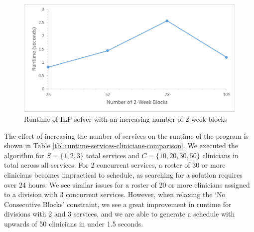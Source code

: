 \begin{figure}[h]
	\centering
	\includegraphics[scale=.5]{fig/runtime_blocks}
	\caption{Runtime of ILP solver with an increasing number of 2-week blocks}
	\label{fig:runtime-blocks}
\end{figure}

The effect of increasing the number of services %
on the runtime of the program is shown in Table \ref{tbl:runtime-services-clinicians-comparison}. We executed the algorithm for $S = \{1, 2, 3\}$ total services and $C = \{10, 20, 30, 50\}$ clinicians in total across all services. For 2 concurrent services, a roster of 30 or more clinicians becomes impractical to schedule, as searching for a solution requires over 24 hours. We see similar issues for a roster of 20 or more clinicians assigned to a division with 3 concurrent services. However, when relaxing the `No Consecutive Blocks' constraint, we see a great improvement in runtime for divisions with 2 and 3 services, and we are able to generate a schedule with upwards of 50 clinicians in under 1.5 seconds. \\  %

